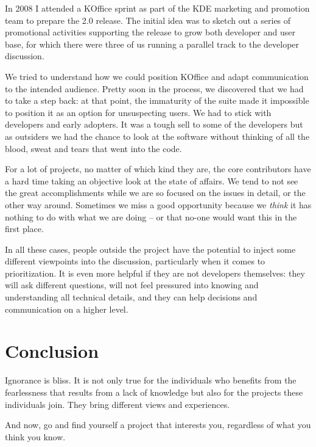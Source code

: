 In 2008 I attended a KOffice sprint as part of the KDE marketing and promotion
team to prepare the 2.0 release. The initial idea was to sketch out a series of
promotional activities supporting the release to grow both developer and user
base, for which there were three of us running a parallel track to the developer
discussion.

We tried to understand how we could position KOffice and adapt communication to
the intended audience. Pretty soon in the process, we discovered that we had to
take a step back: at that point, the immaturity of the suite made it impossible
to position it as an option for unsuspecting users. We had to stick with
developers and early adopters. It was a tough sell to some of the developers but
as outsiders we had the chance to look at the software without thinking of all
the blood, sweat and tears that went into the code.

For a lot of projects, no matter of which kind they are, the core contributors
have a hard time taking an objective look at the state of affairs. We tend to
not see the great accomplishments while we are so focused on the issues in
detail, or the other way around. Sometimes we miss a good opportunity because we
\textit{think} it has nothing to do with what we are doing -- or that no-one
would want this in the first place.

In all these cases, people outside the project have the potential to inject some
different viewpoints into the discussion, particularly when it comes to
prioritization. It is even more helpful if they are not developers themselves:
they will ask different questions, will not feel pressured into knowing and
understanding all technical details, and they can help decisions and
communication on a higher level.

\section*{Conclusion}

Ignorance is bliss. It is not only true for the individuals who benefits from
the fearlessness that results from a lack of knowledge but also for the projects
these individuals join. They bring different views and experiences.

And now, go and find yourself a project that interests you, regardless of what
you think you know.
